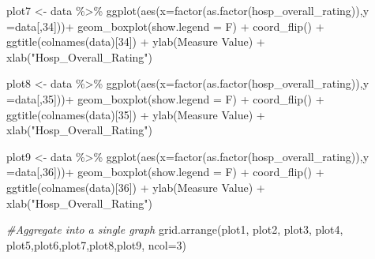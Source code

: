 \documentclass[
]{article}
\newenvironment{Shaded}{\begin{snugshade}}{\end{snugshade}}
\newcommand{\AttributeTok}[1]{\textcolor[rgb]{0.77,0.63,0.00}{#1}}
\newcommand{\CommentTok}[1]{\textcolor[rgb]{0.56,0.35,0.01}{\textit{#1}}}
\newcommand{\DecValTok}[1]{\textcolor[rgb]{0.00,0.00,0.81}{#1}}
\newcommand{\FunctionTok}[1]{\textcolor[rgb]{0.00,0.00,0.00}{#1}}
\newcommand{\NormalTok}[1]{#1}
\newcommand{\OtherTok}[1]{\textcolor[rgb]{0.56,0.35,0.01}{#1}}
\newcommand{\SpecialCharTok}[1]{\textcolor[rgb]{0.00,0.00,0.00}{#1}}
\newcommand{\StringTok}[1]{\textcolor[rgb]{0.31,0.60,0.02}{#1}}
\begin{document}
\begin{Shaded}
\begin{Highlighting}[]
\NormalTok{plot7 }\OtherTok{\textless{}{-}}\NormalTok{ data }\SpecialCharTok{\%\textgreater{}\%} \FunctionTok{ggplot}\NormalTok{(}\FunctionTok{aes}\NormalTok{(}\AttributeTok{x=}\FunctionTok{factor}\NormalTok{(}\FunctionTok{as.factor}\NormalTok{(hosp\_overall\_rating)),}\AttributeTok{y =}\NormalTok{data[,}\DecValTok{34}\NormalTok{]))}\SpecialCharTok{+}
  \FunctionTok{geom\_boxplot}\NormalTok{(}\AttributeTok{show.legend =}\NormalTok{ F) }\SpecialCharTok{+}
  \FunctionTok{coord\_flip}\NormalTok{() }\SpecialCharTok{+}
  \FunctionTok{ggtitle}\NormalTok{(}\FunctionTok{colnames}\NormalTok{(data)[}\DecValTok{34}\NormalTok{]) }\SpecialCharTok{+} 
  \FunctionTok{ylab}\NormalTok{(}\StringTok{\textquotesingle{}Measure Value\textquotesingle{}}\NormalTok{) }\SpecialCharTok{+} \FunctionTok{xlab}\NormalTok{(}\StringTok{"Hosp\_Overall\_Rating"}\NormalTok{)}

\NormalTok{plot8 }\OtherTok{\textless{}{-}}\NormalTok{ data }\SpecialCharTok{\%\textgreater{}\%} \FunctionTok{ggplot}\NormalTok{(}\FunctionTok{aes}\NormalTok{(}\AttributeTok{x=}\FunctionTok{factor}\NormalTok{(}\FunctionTok{as.factor}\NormalTok{(hosp\_overall\_rating)),}\AttributeTok{y =}\NormalTok{data[,}\DecValTok{35}\NormalTok{]))}\SpecialCharTok{+}
  \FunctionTok{geom\_boxplot}\NormalTok{(}\AttributeTok{show.legend =}\NormalTok{ F) }\SpecialCharTok{+}
  \FunctionTok{coord\_flip}\NormalTok{() }\SpecialCharTok{+}
  \FunctionTok{ggtitle}\NormalTok{(}\FunctionTok{colnames}\NormalTok{(data)[}\DecValTok{35}\NormalTok{]) }\SpecialCharTok{+} 
  \FunctionTok{ylab}\NormalTok{(}\StringTok{\textquotesingle{}Measure Value\textquotesingle{}}\NormalTok{) }\SpecialCharTok{+} \FunctionTok{xlab}\NormalTok{(}\StringTok{"Hosp\_Overall\_Rating"}\NormalTok{)}

\NormalTok{plot9 }\OtherTok{\textless{}{-}}\NormalTok{ data }\SpecialCharTok{\%\textgreater{}\%} \FunctionTok{ggplot}\NormalTok{(}\FunctionTok{aes}\NormalTok{(}\AttributeTok{x=}\FunctionTok{factor}\NormalTok{(}\FunctionTok{as.factor}\NormalTok{(hosp\_overall\_rating)),}\AttributeTok{y =}\NormalTok{data[,}\DecValTok{36}\NormalTok{]))}\SpecialCharTok{+}
  \FunctionTok{geom\_boxplot}\NormalTok{(}\AttributeTok{show.legend =}\NormalTok{ F) }\SpecialCharTok{+}
  \FunctionTok{coord\_flip}\NormalTok{() }\SpecialCharTok{+}
  \FunctionTok{ggtitle}\NormalTok{(}\FunctionTok{colnames}\NormalTok{(data)[}\DecValTok{36}\NormalTok{]) }\SpecialCharTok{+} 
  \FunctionTok{ylab}\NormalTok{(}\StringTok{\textquotesingle{}Measure Value\textquotesingle{}}\NormalTok{) }\SpecialCharTok{+} \FunctionTok{xlab}\NormalTok{(}\StringTok{"Hosp\_Overall\_Rating"}\NormalTok{)}


\CommentTok{\#Aggregate into a single graph}
\FunctionTok{grid.arrange}\NormalTok{(plot1, plot2, plot3, plot4, plot5,plot6,plot7,plot8,plot9, }\AttributeTok{ncol=}\DecValTok{3}\NormalTok{)}
\end{Highlighting}
\end{Shaded}
\end{document}
